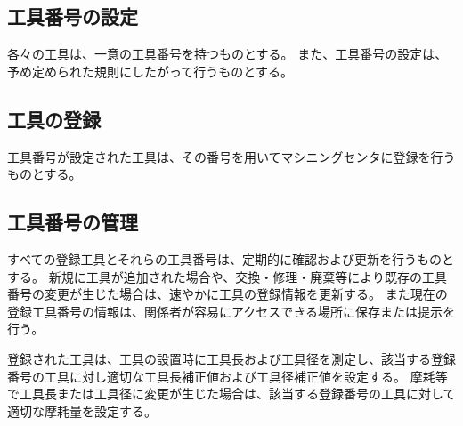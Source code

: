 





\subsection{工具番号の設定}
各々の工具は、一意の工具番号を持つものとする。
また、工具番号の設定は、予め定められた規則にしたがって行うものとする。

\subsection{工具の登録}
工具番号が設定された工具は、その番号を用いてマシニングセンタに登録を行うものとする。

\subsection{工具番号の管理}
すべての登録工具とそれらの工具番号は、定期的に確認および更新を行うものとする。
新規に工具が追加された場合や、交換・修理・廃棄等により既存の工具番号の変更が生じた場合は、速やかに工具の登録情報を更新する。
また現在の登録工具番号の情報は、関係者が容易にアクセスできる場所に保存または提示を行う。



登録された工具は、工具の設置時に工具長および工具径を測定し、該当する登録番号の工具に対し適切な工具長補正値および工具径補正値を設定する。
摩耗等で工具長または工具径に変更が生じた場合は、該当する登録番号の工具に対して適切な摩耗量を設定する。

